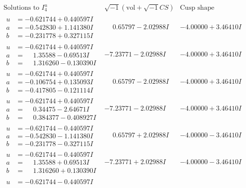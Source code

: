 \documentclass[1p]{elsarticle_modified}
\theoremstyle{definition}
\newcommand{\I}{\sqrt{-1}}
\begin{document}
$$\begin{array}{c|c|c}  
\text{Solutions to }I^u_{4}& \I (\text{vol} + \sqrt{-1}CS) & \text{Cusp shape}\\
 \hline 
\begin{aligned}
u &= -0.621744 + 0.440597 I \\
a &= -0.542830 + 1.141380 I \\
b &= -0.231778 + 0.327115 I\end{aligned}
 & \phantom{-}0.65797 - 2.02988 I & -4.00000 + 3.46410 I \\ \hline\begin{aligned}
u &= -0.621744 + 0.440597 I \\
a &= \phantom{-}1.35588 - 0.69513 I \\
b &= \phantom{-}1.316260 - 0.130390 I\end{aligned}
 & -7.23771 - 2.02988 I & -4.00000 + 3.46410 I \\ \hline\begin{aligned}
u &= -0.621744 + 0.440597 I \\
a &= -0.106754 + 0.135093 I \\
b &= -0.417805 - 0.121114 I\end{aligned}
 & \phantom{-}0.65797 - 2.02988 I & -4.00000 + 3.46410 I \\ \hline\begin{aligned}
u &= -0.621744 + 0.440597 I \\
a &= \phantom{-}0.34475 - 2.64671 I \\
b &= \phantom{-}0.384377 - 0.408927 I\end{aligned}
 & -7.23771 - 2.02988 I & -4.00000 + 3.46410 I \\ \hline\begin{aligned}
u &= -0.621744 - 0.440597 I \\
a &= -0.542830 - 1.141380 I \\
b &= -0.231778 - 0.327115 I\end{aligned}
 & \phantom{-}0.65797 + 2.02988 I & -4.00000 - 3.46410 I \\ \hline\begin{aligned}
u &= -0.621744 - 0.440597 I \\
a &= \phantom{-}1.35588 + 0.69513 I \\
b &= \phantom{-}1.316260 + 0.130390 I\end{aligned}
 & -7.23771 + 2.02988 I & -4.00000 - 3.46410 I \\ \hline\begin{aligned}
u &= -0.621744 - 0.440597 I \\

\end{aligned}
\end{array}$$
\end{document}
